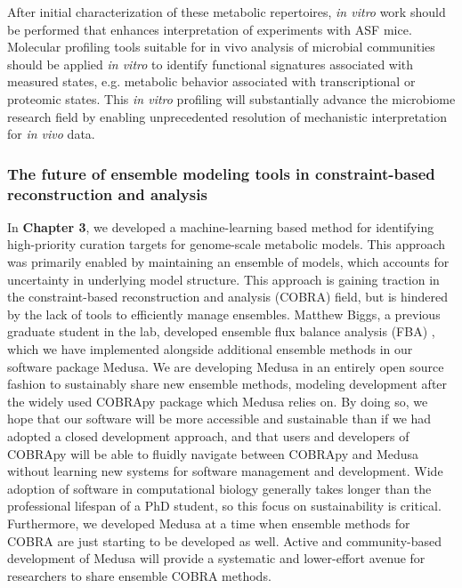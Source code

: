 \documentclass[11pt,twocolumn,notitlepage,openany,twoside]{book}
\begin{document}
\begin{refsection}
After initial characterization of these metabolic repertoires, \textit{in vitro} work should be performed that enhances interpretation of experiments with ASF mice. Molecular profiling tools suitable for in vivo analysis of microbial communities should be applied \textit{in vitro} to identify functional signatures associated with measured states, e.g. metabolic behavior associated with transcriptional or proteomic states. This \textit{in vitro} profiling will substantially advance the microbiome research field by enabling unprecedented resolution of mechanistic interpretation for \textit{in vivo} data.

\subsubsection{The future of ensemble modeling tools in constraint-based reconstruction and analysis}

In \textbf{Chapter 3}, we developed a machine-learning based method for identifying high-priority curation targets for genome-scale metabolic models. This approach was primarily enabled by maintaining an ensemble of models, which accounts for uncertainty in underlying model structure. This approach is gaining traction in the constraint-based reconstruction and analysis (COBRA) field, but is hindered by the lack of tools to efficiently manage ensembles. Matthew Biggs, a previous graduate student in the lab, developed ensemble flux balance analysis (FBA) \cite{Biggs2017-md}, which we have implemented alongside additional ensemble methods in our software package Medusa. We are developing Medusa in an entirely open source fashion to sustainably share new ensemble methods, modeling development after the widely used COBRApy package which Medusa relies on. By doing so, we hope that our software will be more accessible and sustainable than if we had adopted a closed development approach, and that users and developers of COBRApy will be able to fluidly navigate between COBRApy and Medusa without learning new systems for software management and development. Wide adoption of software in computational biology generally takes longer than the professional lifespan of a PhD student, so this focus on sustainability is critical. Furthermore, we developed Medusa at a time when ensemble methods for COBRA are just starting to be developed as well. Active and community-based development of Medusa will provide a systematic and lower-effort avenue for researchers to share ensemble COBRA methods.


\end{refsection}
\end{document}
